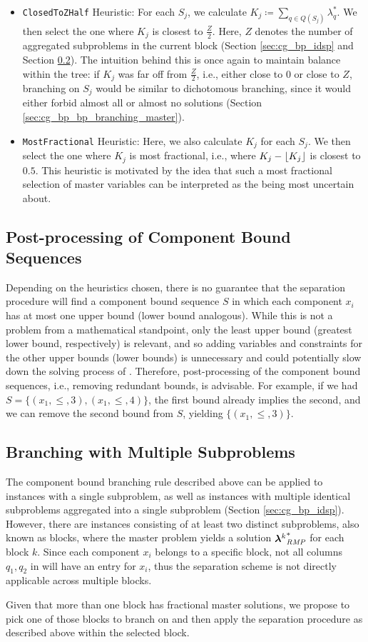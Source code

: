 \begin{itemize}
\item	\texttt{ClosedToZHalf} Heuristic: For each $S_j$, we calculate $K_j \coloneqq \sum_{q \in Q(S_j)} \lambda_q^*$. We then select the one where $K_j$ is closest to $\frac{Z}{2}$. Here, $Z$ denotes the number of aggregated subproblems in the current block (Section \ref{sec:cg_bp_idsp} and Section \ref{sec:cmpbnd_separation_branching}). The intuition behind this is once again to maintain balance within the tree: if $K_j$ was far off from $\frac{Z}{2}$, i.e., either close to $0$ or close to $Z$, branching on $S_j$ would be similar to dichotomous branching, since it would either forbid almost all or almost no solutions (Section \ref{sec:cg_bp_bp_branching_master}).
\item	\texttt{MostFractional} Heuristic: Here, we also calculate $K_j$ for each $S_j$. We then select the one where $K_j$ is most fractional, i.e., where $K_j - \lfloor K_j\rfloor$ is closest to $0.5$. This heuristic is motivated by the idea that such a most fractional selection of master variables can be interpreted as the \RMP{} being most uncertain about.
\end{itemize}

\subsection{Post-processing of Component Bound Sequences}\label{sec:cmpbnd_separation_postprocessing}
Depending on the heuristics chosen, there is no guarantee that the separation procedure will find a component bound sequence $S$ in which each component $x_i$ has at most one upper bound (lower bound analogous). While this is not a problem from a mathematical standpoint, only the least upper bound (greatest lower bound, respectively) is relevant, and so adding variables and constraints for the other upper bounds (lower bounds) is unnecessary and could potentially slow down the solving process of \SP{}. Therefore, post-processing of the component bound sequences, i.e., removing redundant bounds, is advisable. For example, if we had $S = \{(x_1, \leq, 3), (x_1, \leq, 4)\}$, the first bound already implies the second, and we can remove the second bound from $S$, yielding $\{(x_1, \leq, 3)\}$.

\subsection{Branching with Multiple Subproblems}\label{sec:cmpbnd_separation_branching}
The component bound branching rule described above can be applied to instances with a single subproblem, as well as instances with multiple identical subproblems aggregated into a single subproblem (Section \ref{sec:cg_bp_idsp}). However, there are instances consisting of at least two distinct subproblems, also known as blocks, where the master problem yields a solution ${{\bm{\lambda}}^k}^*_{\textit{RMP}}{}$ for each block $k$. Since each component $x_i$ belongs to a specific block, not all columns $q_1, q_2$ in \RMP{} will have an entry for $x_i$, thus the separation scheme is not directly applicable across multiple blocks.

Given that more than one block has fractional master solutions, we propose to pick one of those blocks to branch on and then apply the separation procedure as described above within the selected block.
